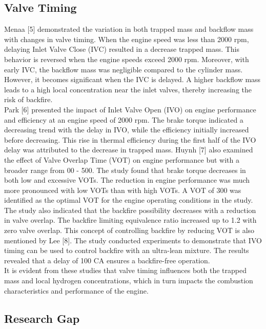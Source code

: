 \documentclass[conference]{IEEEtran}
\begin{document}
\subsection{Valve Timing}

Menaa [5] demonstrated the variation in both trapped mass and backflow mass with changes in valve timing. When the engine speed was less than 2000 rpm, delaying Inlet Valve Close (IVC) resulted in a decrease trapped mass. This behavior is reversed when the engine speeds exceed 2000 rpm. Moreover, with early IVC, the backflow mass was negligible compared to the cylinder mass. However, it becomes significant when the IVC is delayed. A higher backflow mass leads to a high local concentration near the inlet valves, thereby increasing the risk of backfire.\\

Park [6] presented the impact of Inlet Valve Open (IVO) on engine performance and efficiency at an engine speed of 2000 rpm. The brake torque indicated a decreasing trend with the delay in IVO, while the efficiency initially increased before decreasing. This rise in thermal efficiency during the first half of the IVO delay was attributed to the decrease in trapped mass. Huynh [7] also examined the effect of Valve Overlap Time (VOT) on engine performance but with a broader range from 00 - 500. The study found that brake torque decreases in both low and excessive VOTs. The reduction in engine performance was much more pronounced with low VOTs than with high VOTs. A VOT of 300 was identified as the optimal VOT for the engine operating conditions in the study. The study also indicated that the backfire possibility decreases with a reduction in valve overlap. The backfire limiting equivalence ratio increased up to 1.2 with zero valve overlap. This concept of controlling backfire by reducing VOT is also mentioned by Lee [8]. The study conducted experiments to demonstrate that IVO timing can be used to control backfire with an ultra-lean mixture. The results revealed that a delay of 100 CA ensures a backfire-free operation.\\

It is evident from these studies that valve timing influences both the trapped mass and local hydrogen concentrations, which in turn impacts the combustion characteristics and performance of the engine.

\subsection{Research Gap}
\end{document}
